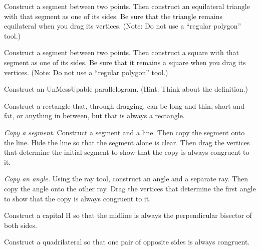 \documentclass{ximera}
\begin{document}
\begin{problem}
Construct a segment between two points.  Then construct an equilateral triangle with that segment as one of its sides.  Be sure that the triangle remains equilateral when you drag its vertices.   (Note:  Do not use a ``regular polygon'' tool.)
\end{problem}

\begin{problem}
Construct a segment between two points.  Then construct a square with that segment as one of its sides.  Be sure that it remains a square when you drag its vertices.  (Note:  Do not use a ``regular polygon'' tool.)
\end{problem}

\begin{problem}
Construct an UnMessUpable parallelogram.  (Hint:  Think about the definition.)  
\end{problem}

\begin{problem}
Construct a rectangle that, through dragging, can be long and thin, short and fat, or anything in between, but that is always a rectangle.
\end{problem}

\begin{problem}
\emph{Copy a segment.}  Construct a segment and a line.  Then copy the segment onto the line.  Hide the line so that the segment alone is clear.  Then drag the vertices that determine the initial segment to show that the copy is always congruent to it.  
\end{problem}

\begin{problem}
\emph{Copy an angle.}  Using the ray tool, construct an angle and a separate ray.  Then copy the angle onto the other ray.  Drag the vertices that determine the first angle to show that the copy is always congruent to it.  
\end{problem}

\begin{problem}
Construct a capital H so that the midline is always the perpendicular bisector of both sides.  
\end{problem}

\begin{problem}
Construct a quadrilateral so that one pair of opposite sides is always congruent.  
\end{problem}
\end{document}
